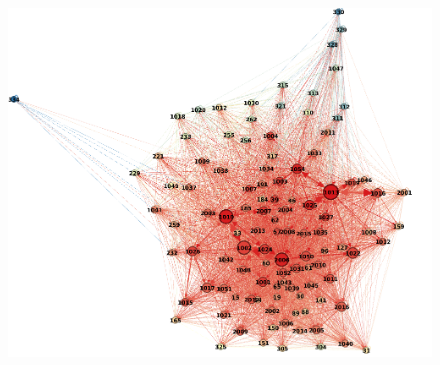 \documentclass{beamer}
\begin{document}
\begin{frame}
\begin{columns}
\begin{column}{.5\linewidth}
\begin{figure}[H]
	\includegraphics[width=1\linewidth]{pictures/new_model_gephi.png} 
\end{figure}

\end{column}
\end{columns}
\end{frame}
\end{document}
